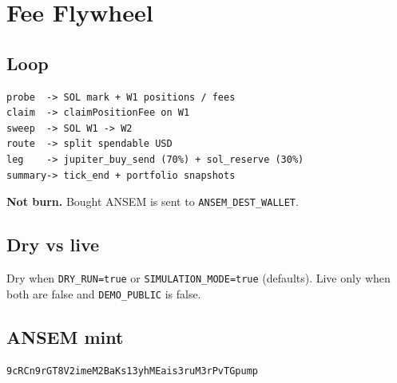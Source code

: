 \chapter{Fee Flywheel}

\section{Loop}

\begin{lstlisting}
probe  -> SOL mark + W1 positions / fees
claim  -> claimPositionFee on W1
sweep  -> SOL W1 -> W2
route  -> split spendable USD
leg    -> jupiter_buy_send (70%) + sol_reserve (30%)
summary-> tick_end + portfolio snapshots
\end{lstlisting}

\textbf{Not burn.} Bought ANSEM is sent to \texttt{ANSEM\_DEST\_WALLET}.

\section{Dry vs live}

Dry when \texttt{DRY\_RUN=true} or \texttt{SIMULATION\_MODE=true} (defaults). Live only when both are false and \texttt{DEMO\_PUBLIC} is false.

\section{ANSEM mint}

\begin{lstlisting}
9cRCn9rGT8V2imeM2BaKs13yhMEais3ruM3rPvTGpump
\end{lstlisting}
